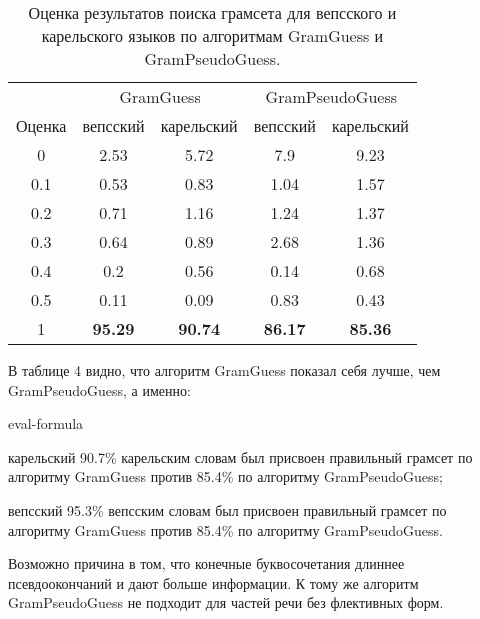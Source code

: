 \begin{table}
	\caption{Оценка результатов поиска грамсета для вепсского и карельского языков по алгоритмам GramGuess и GramPseudoGuess.}	
	\label{tab:Gram:quantity}

\setlength{\tabcolsep}{8pt}

\begin{tabular}{ c c c c c} \toprule
     & \multicolumn{2}{c}{GramGuess}& \multicolumn{2}{c}{GramPseudoGuess}\\ \cmidrule(r){2-5}
                                                
 Оценка & вепсский & карельский & вепсский & карельский\\ \midrule
0 & 2.53 & 5.72 & 7.9 & 9.23\\
0.1 & 0.53 & 0.83 & 1.04 & 1.57\\
0.2 & 0.71 & 1.16 & 1.24 & 1.37\\
0.3 & 0.64 & 0.89 & 2.68 & 1.36\\
0.4 & 0.2 &	0.56 & 0.14 & 0.68\\
0.5 & 0.11 & 0.09 & 0.83 & 0.43\\
1 &	\textbf{95.29} & \textbf{90.74} & \textbf{86.17} & \textbf{85.36}\\
\bottomrule
\end{tabular}
\end{table}

В таблице 4 видно, что алгоритм GramGuess показал себя лучше, чем GramPseudoGuess, а именно: 

\begin{labeling}{eval-formula}
\item [карельский] 
90.7\% карельским словам был присвоен правильный грамсет по алгоритму GramGuess против 85.4\% по алгоритму GramPseudoGuess;
\hfill \break

\item [вепсский] 
95.3\% вепсским словам был присвоен правильный грамсет по алгоритму GramGuess против 85.4\% по алгоритму GramPseudoGuess.
\end{labeling}

Возможно причина в том,  что конечные буквосочетания длиннее псевдоокончаний и дают больше информации. 
К тому же алгоритм GramPseudoGuess не подходит для частей речи без флективных форм.


